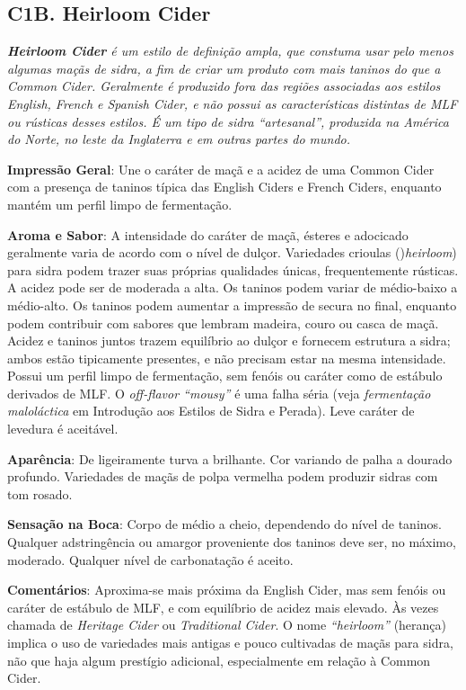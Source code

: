 \subsection*{C1B. Heirloom Cider}

\textit{\textbf{Heirloom Cider} é um estilo de definição ampla, que constuma usar pelo menos algumas maçãs de sidra, a fim de criar um produto com mais taninos do que a Common Cider. Geralmente é produzido fora das regiões associadas aos estilos English, French e Spanish Cider, e não possui as características distintas de MLF ou rústicas desses estilos. É um tipo de sidra “artesanal”, produzida na América do Norte, no leste da Inglaterra e em outras partes do mundo.}

\textbf{Impressão Geral}: Une o caráter de maçã e a acidez de uma Common Cider com a presença de taninos típica das English Ciders e French Ciders, enquanto mantém um perfil limpo de fermentação.

\textbf{Aroma e Sabor}: A intensidade do caráter de maçã, ésteres e adocicado geralmente varia de acordo com o nível de dulçor. Variedades crioulas ()\textit{heirloom}) para sidra podem trazer suas próprias qualidades únicas, frequentemente rústicas. A acidez pode ser de moderada a alta. Os taninos podem variar de médio-baixo a médio-alto. Os taninos podem aumentar a impressão de secura no final, enquanto podem contribuir com sabores que lembram madeira, couro ou casca de maçã. Acidez e taninos juntos trazem equilíbrio ao dulçor e fornecem estrutura a sidra; ambos estão tipicamente presentes, e não precisam estar na mesma intensidade. Possui um perfil limpo de fermentação, sem fenóis ou caráter como de estábulo derivados de MLF. O \textit{off-flavor “mousy”} é uma falha séria (veja \textit{fermentação maloláctica} em Introdução aos Estilos de Sidra e Perada). Leve caráter de levedura é aceitável.

\textbf{Aparência}: De ligeiramente turva a brilhante. Cor variando de palha a dourado profundo. Variedades de maçãs de polpa vermelha podem produzir sidras com tom rosado.

\textbf{Sensação na Boca}: Corpo de médio a cheio, dependendo do nível de taninos. Qualquer adstringência ou amargor proveniente dos taninos deve ser, no máximo, moderado. Qualquer nível de carbonatação é aceito.

\textbf{Comentários}: Aproxima-se mais próxima da English Cider, mas sem fenóis ou caráter de estábulo de MLF, e com equilíbrio de acidez mais elevado. Às vezes chamada de \textit{Heritage Cider} ou \textit{Traditional Cider}. O nome \textit{“heirloom”} (herança) implica o uso de variedades mais antigas e pouco cultivadas de maçãs para sidra, não que haja algum prestígio adicional, especialmente em relação à Common Cider.

